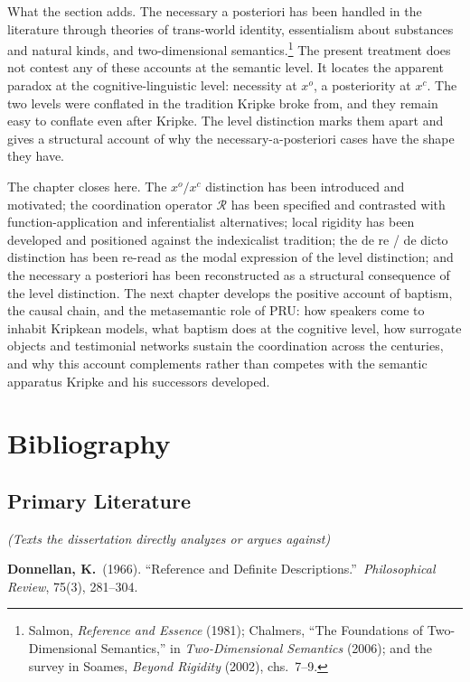\documentclass[12pt,a4paper]{article}
\begin{document}
What the section adds. The necessary a posteriori has been handled in the literature through theories of trans-world identity, essentialism about substances and natural kinds, and two-dimensional semantics.\footnote{Salmon, \emph{Reference and Essence} (1981); Chalmers, ``The Foundations of Two-Dimensional Semantics,'' in \emph{Two-Dimensional Semantics} (2006); and the survey in Soames, \emph{Beyond Rigidity} (2002), chs.~7--9.} The present treatment does not contest any of these accounts at the semantic level. It locates the apparent paradox at the cognitive-linguistic level: necessity at \(x^o\), a posteriority at \(x^c\). The two levels were conflated in the tradition Kripke broke from, and they remain easy to conflate even after Kripke. The level distinction marks them apart and gives a structural account of why the necessary-a-posteriori cases have the shape they have.

The chapter closes here. The \(x^o/x^c\) distinction has been introduced and motivated; the coordination operator \(\mathcal{R}\) has been specified and contrasted with function-application and inferentialist alternatives; local rigidity has been developed and positioned against the indexicalist tradition; the de re / de dicto distinction has been re-read as the modal expression of the level distinction; and the necessary a posteriori has been reconstructed as a structural consequence of the level distinction. The next chapter develops the positive account of baptism, the causal chain, and the metasemantic role of PRU: how speakers come to inhabit Kripkean models, what baptism does at the cognitive level, how surrogate objects and testimonial networks sustain the coordination across the centuries, and why this account complements rather than competes with the semantic apparatus Kripke and his successors developed.

\section{Bibliography}\label{bibliography}

\subsection{Primary Literature}\label{primary-literature}

\emph{(Texts the dissertation directly analyzes or argues against)}

\textbf{Donnellan, K.}~(1966). ``Reference and Definite Descriptions.''~\emph{Philosophical Review}, 75(3), 281--304.
\end{document}
